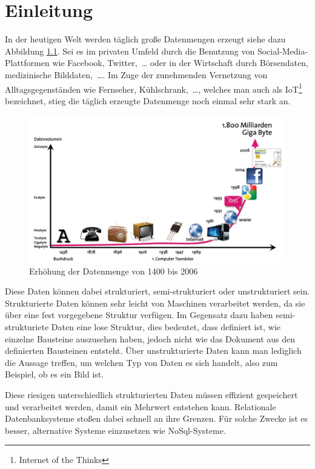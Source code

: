 \chapter{Einleitung}
In der heutigen Welt werden täglich große Datenmengen erzeugt siehe dazu
Abbildung \ref{fig:data-grow}. Sei es im privaten Umfeld durch die Benutzung
von Social-Media-Plattformen wie Facebook, Twitter,~\dots{} oder in der
Wirtschaft durch Börsendaten, medizinische Bilddaten,~\dots . Im Zuge der
zunehmenden Vernetzung von Alltagsgegenständen wie Fernseher,
Kühlschrank,~\dots{}, welches man auch als IoT\footnote{Internet of the Thinks}
bezeichnet, stieg die täglich erzeugte Datenmenge noch einmal sehr stark an.

\begin{figure}
\centering
\includegraphics[scale=0.375]{images/bitkom-lf-bigdata-2012-data_grow.jpg}
\caption{Erhöhung der Datenmenge von 1400 bis 2006 \cite{Weber2012}}
\label{fig:data-grow}
\end{figure}

Diese Daten können dabei strukturiert, semi-strukturiert oder unstrukturiert
sein. Strukturierte Daten können sehr leicht von Maschinen verarbeitet werden,
da sie über eine fest vorgegebene Struktur verfügen. Im Gegensatz dazu haben
semi-strukturiete Daten eine lose Struktur, dies bedeutet, dass definiert ist,
wie einzelne Bausteine auszusehen haben, jedoch nicht wie das Dokument aus den
definierten Bausteinen entsteht. Über unstrukturierte Daten kann man lediglich
die Aussage treffen, um welchen Typ von Daten es sich handelt, also zum
Beispiel, ob es ein Bild ist.

Diese riesigen unterschiedlich strukturierten Daten müssen effizient
gespeichert und verarbeitet werden, damit ein Mehrwert entstehen kann.
Relationale Datenbanksysteme stoßen dabei schnell an ihre Grenzen. Für solche
Zwecke ist es besser, alternative Systeme einzusetzen wie NoSql-Systeme.

